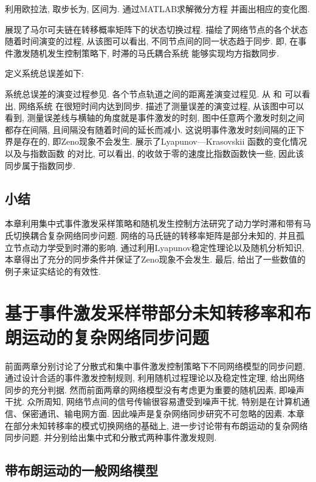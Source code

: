  利用欧拉法, 取步长为, 区间为. 通过MATLAB求解微分方程  并画出相应的变化图.

 展现了马尔可夫链在转移概率矩阵下的状态切换过程.  描绘了网络节点的各个状态随着时间演变的过程, 从该图可以看出, 不同节点间的同一状态趋于同步. 即, 在事件激发随机发生控制策略下, 时滞的马氏耦合系统  能够实现均方指数同步.

定义系统总误差如下:

系统总误差的演变过程参见. 各个节点轨道之间的距离差演变过程见. 从 和 可以看出, 网络系统  在很短时间内达到同步.  描述了测量误差的演变过程, 从该图中可以看到, 测量误差线与横轴的角度就是事件激发的时刻, 图中任意两个激发时刻之间都存在间隔, 且间隔没有随着时间的延长而减小. 这说明事件激发时刻间隔的正下界是存在的, 即Zeno现象不会发生.  展示了Lyapunov—Krasovskii 函数的变化情况以及与指数函数 的对比, 可以看出, 的收敛于零的速度比指数函数快一些, 因此该同步属于指数同步.

\section{小结}\label{con}
     本章利用集中式事件激发采样策略和随机发生控制方法研究了动力学时滞和带有马氏切换耦合复杂网络同步问题. 网络的马氏链的转移率矩阵是部分未知的, 并且孤立节点动力学受到时滞的影响. 通过利用Lyapunov稳定性理论以及随机分析知识, 本章得出了充分的同步条件并保证了Zeno现象不会发生. 最后, 给出了一些数值的例子来证实结论的有效性.


\chapter{基于事件激发采样带部分未知转移率和布朗运动的复杂网络同步问题}

        前面两章分别讨论了分散式和集中事件激发控制策略下不同网络模型的同步问题, 通过设计合适的事件激发控制规则, 利用随机过程理论以及稳定性定理, 给出网络同步的充分判据. 然而前面两章的网络模型没有考虑更为重要的随机因素, 即噪声干扰. 众所周知, 网络节点间的信号传输很容易遭受到噪声干扰, 特别是在计算机通信、保密通讯、输电网方面. 因此噪声是复杂网络同步研究不可忽略的因素. 本章在部分未知转移率的模式切换网络的基础上, 进一步讨论带有布朗运动的复杂网络同步问题. 并分别给出集中式和分散式两种事件激发规则.

\section{带布朗运动的一般网络模型}

